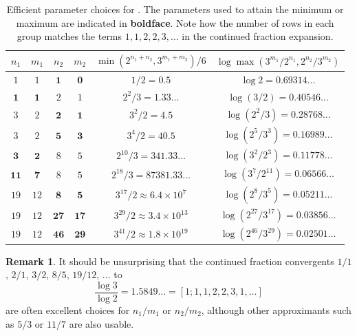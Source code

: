 \documentclass[10pt,a4paper,reqno]{amsart}
\numberwithin{equation}{section}
\theoremstyle{plain}
\theoremstyle{definition}
\newtheorem{remark}[remark]{Remark}
\begin{document}
\begin{table}[ht]
\centering
\begin{tabular}{|c|c|c|c|c|c|}
\hline
\rule{0pt}{12pt}$n_1$ & $m_1$ & $n_2$ & $m_2$ & $\min(2^{n_1+n_2},3^{m_1+m_2})/6$ & $\log \max(3^{m_1}/2^{n_1}, 2^{n_2}/3^{m_2})$ \\[2pt]
\hline
\rule{0pt}{12pt}$1$ & $1$ & $\mathbf{1}$ & $\mathbf{0}$ & $1/2 = 0.5$ & $\log 2 = 0.69314\dots$ \\
\hline
\rule{0pt}{12pt}$\mathbf{1}$ & $\mathbf{1}$ & $2$ & $1$ & $2^2/3 = 1.33\dots$ & $\log (3/2) = 0.40546\dots$\\
\hline
\rule{0pt}{12pt}$3$ & $2$ & $\mathbf{2}$ & $\mathbf{1}$ & $3^2/2 = 4.5$ & $\log (2^2/3) = 0.28768\dots$ \\
$3$ & $2$ & $\mathbf{5}$ & $\mathbf{3}$ & $3^4/2 = 40.5$ & $\log (2^5/3^3) = 0.16989\dots$ \\
\hline
\rule{0pt}{12pt}$\mathbf{3}$ & $\mathbf{2}$ & $8$ & $5$ & $2^{10}/3 = 341.33\dots$ & $\log (3^2/2^3) = 0.11778\dots$\\
$\mathbf{11}$ & $\mathbf{7}$ & $8$ & $5$ & $2^{18}/3 = 87381.33\dots$ & $\log (3^7/2^{11}) = 0.06566\dots$ \\
\hline
\rule{0pt}{12pt}$19$ & $12$ & $\mathbf{8}$ & $\mathbf{5}$ & $3^{17}/2 \approx 6.4 \times 10^7$ & $\log (2^8/3^5) = 0.05211\dots$ \\
$19$ & $12$ & $\mathbf{27}$ & $\mathbf{17}$ & $3^{29}/2 \approx 3.4 \times 10^{13}$ & $\log (2^{27}/3^{17}) = 0.03856\dots$ \\
$19$ & $12$ & $\mathbf{46}$ & $\mathbf{29}$ & $3^{41}/2 \approx 1.8 \times 10^{19} $ & $\log (2^{46}/3^{29}) = 0.02501\dots$ \\
\hline
\end{tabular}
\bigskip

\caption{Efficient parameter choices for .  The parameters used to attain the minimum or maximum are indicated in \textbf{boldface}. Note how the number of rows in each group matches the terms $1,1,2,2,3,\dots$ in the continued fraction expansion.}\label{approx-table}
\end{table}

\begin{remark}
It should be unsurprising that the continued fraction convergents $1/1$, $2/1$, $3/2$, $8/5$, $19/12$, $\dots$ to
$$\frac{\log 3}{\log 2} = 1.5849\dots = [1; 1,1,2,2,3,1,\dots]$$
are often excellent choices for $n_1/m_1$ or $n_2/m_2$, although other approximants such as $5/3$ or $11/7$ are also usable.
\end{remark}
\end{document}
